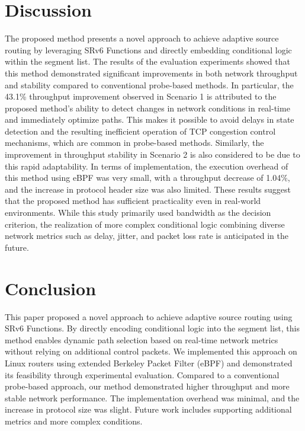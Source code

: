 \documentclass[conference]{IEEEtran}
\begin{document}
\section{Discussion}

The proposed method presents a novel approach to achieve adaptive source routing by leveraging SRv6 Functions and directly embedding conditional logic within the segment list.
The results of the evaluation experiments showed that this method demonstrated significant improvements in both network throughput and stability compared to conventional probe-based methods.
In particular, the 43.1\% throughput improvement observed in Scenario 1 is attributed to the proposed method's ability to detect changes in network conditions in real-time and immediately optimize paths. This makes it possible to avoid delays in state detection and the resulting inefficient operation of TCP congestion control mechanisms, which are common in probe-based methods.
Similarly, the improvement in throughput stability in Scenario 2 is also considered to be due to this rapid adaptability.
In terms of implementation, the execution overhead of this method using eBPF was very small, with a throughput decrease of 1.04\%, and the increase in protocol header size was also limited. These results suggest that the proposed method has sufficient practicality even in real-world environments.
While this study primarily used bandwidth as the decision criterion, the realization of more complex conditional logic combining diverse network metrics such as delay, jitter, and packet loss rate is anticipated in the future.

\section{Conclusion}

This paper proposed a novel approach to achieve adaptive source routing using SRv6 Functions.
By directly encoding conditional logic into the segment list, this method enables dynamic path selection based on real-time network metrics without relying on additional control packets.
We implemented this approach on Linux routers using extended Berkeley Packet Filter (eBPF) and demonstrated its feasibility through experimental evaluation.
Compared to a conventional probe-based approach, our method demonstrated higher throughput and more stable network performance.
The implementation overhead was minimal, and the increase in protocol size was slight.
Future work includes supporting additional metrics and more complex conditions.



\end{document}

